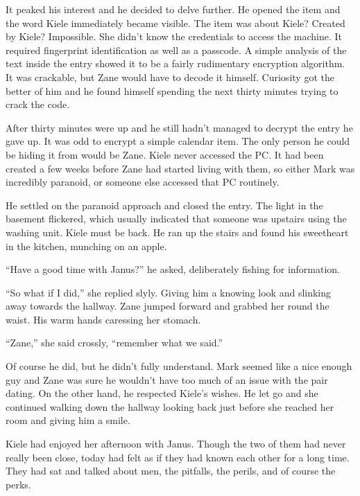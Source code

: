 It peaked his interest and he decided to delve further.  He opened the item and the word Kiele immediately became visible.  The item was about Kiele?  Created by Kiele?  Impossible.  She didn't know the credentials to access the machine.  It required fingerprint identification as well as a passcode.  A simple analysis of the text inside the entry showed it to be a fairly rudimentary encryption algorithm.  It was crackable, but Zane would have to decode it himself.  Curiosity got the better of him and he found himself spending the next thirty minutes trying to crack the code.

After thirty minutes were up and he still hadn't managed to decrypt the entry he gave up.  It was odd to encrypt a simple calendar item.  The only person he could be hiding it from would be Zane.  Kiele never accessed the PC.  It had been created a few weeks before Zane had started living with them, so either Mark was incredibly paranoid, or someone else accessed that PC routinely.

He settled on the paranoid approach and closed the entry.  The light in the basement flickered, which usually indicated that someone was upstairs using the washing unit.  Kiele must be back.  He ran up the stairs and found his sweetheart in the kitchen, munching on an apple.

``Have a good time with Janus?'' he asked, deliberately fishing for information.

``So what if I did,'' she replied slyly.  Giving him a knowing look and slinking away towards the hallway.  Zane jumped forward and grabbed her round the waist.  His warm hands caressing her stomach.  

``Zane,'' she said crossly, ``remember what we said.''

Of course he did, but he didn't fully understand.  Mark seemed like a nice enough guy and Zane was sure he wouldn't have too much of an issue with the pair dating.  On the other hand, he respected Kiele's wishes.  He let go and she continued walking down the hallway looking back just before she reached her room and giving him a smile.



\thoughtbreak



Kiele had enjoyed her afternoon with Janus.  Though the two of them had never really been close, today had felt as if they had known each other for a long time.  They had sat and talked about men, the pitfalls, the perils, and of course the perks.

